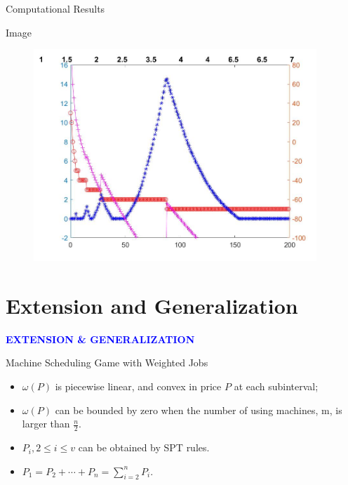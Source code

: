 \documentclass[14pt]{beamer}
\begin{document}
\begin{frame}{Computational Results}

\end{frame}


\begin{frame}{Image}
	\vspace{-3mm}
	\begin{figure}[H]
	\centering
	\includegraphics[width=0.95\textwidth]{Figures/Image30}
	\end{figure}
	\centering
\end{frame}

\section{Extension and Generalization}
\begin{frame}
\centering
\large
\textcolor{blue}{\bf {\huge E}XTENSION \&  {\huge G}ENERALIZATION}
\end{frame}

\begin{frame}{Machine Scheduling Game with Weighted Jobs}
	\begin{itemize}
	\justifying
		\item ${\omega(P)}$ is piecewise linear, and convex in price $P$ at each subinterval;
		\item $\omega(P)$ can be bounded by zero when the number of using machines, m, is larger than $\frac{n}{2}$.
		\item $P_i, 2 \leq i \leq v$ can be obtained by SPT rules.
		\item $P_{1}=P_{2}+\cdots+P_{n}=\sum_{i=2}^n P_i$.
\end{itemize}
\end{frame}
\end{document}
